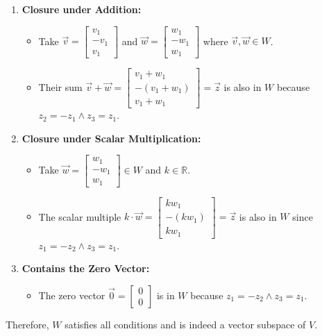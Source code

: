 \begin{enumerate}
    \item \textbf{Closure under Addition:}
        \begin{itemize}
            \item Take \(\vec{v} = \begin{bmatrix} v_1 \\ -v_1 \\ v_1 \end{bmatrix}\) and \(\vec{w} = \begin{bmatrix} w_1 \\ -w_1 \\ w_1 \end{bmatrix}\) where \(\vec v, \vec w \in W \).
            \item Their sum \(\vec{v} + \vec{w} = \begin{bmatrix} v_1 + w_1 \\ -(v_1 + w_1) \\ v_1 + w_1 \end{bmatrix} = \vec z\) is also in \(W\) because \(z_2 = -z_1 \land z_3 = z_1\).
        \end{itemize}
        
    \item \textbf{Closure under Scalar Multiplication:}
        \begin{itemize}
            \item Take \(\vec{w} = \begin{bmatrix} w_1 \\ -w_1 \\ w_1 \end{bmatrix} \in W\) and \(k \in \mathbb{R}\).
            \item The scalar multiple \(k \cdot \vec{w} = \begin{bmatrix} kw_1 \\ -(kw_1) \\ kw_1 \end{bmatrix} = \vec z\) is also in \(W\) since \(z_1 = -z_2 \land z_3 = z_1\).
        \end{itemize}
    
    \item \textbf{Contains the Zero Vector:}
        \begin{itemize}
            \item The zero vector \(\vec{0} = \begin{bmatrix} 0 \\ 0 \end{bmatrix}\) is in \(W\) because \(z_1 = -z_2 \land z_3 = z_1\).
        \end{itemize}
\end{enumerate}
Therefore, \(W\) satisfies all conditions and is indeed a vector subspace of \(V\).
\\

